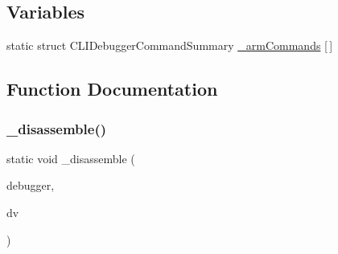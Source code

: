 \subsection*{Variables}
\begin{DoxyCompactItemize}
\item 
static struct C\+L\+I\+Debugger\+Command\+Summary \mbox{\hyperlink{arm_2debugger_2cli-debugger_8c_a4369077d6b3042008429e77a98dbd444}{\+\_\+arm\+Commands}} \mbox{[}$\,$\mbox{]}
\end{DoxyCompactItemize}


\subsection{Function Documentation}
\mbox{\label{arm_2debugger_2cli-debugger_8c_ab744a20db75c627a6cf552eee9339cc0}} 
\subsubsection{\texorpdfstring{\+\_\+disassemble()}{\_disassemble()}}
{\footnotesize\ttfamily static void \+\_\+disassemble (\begin{DoxyParamCaption}\item[{struct C\+L\+I\+Debugger\+System $\ast$}]{debugger,  }\item[{struct C\+L\+I\+Debug\+Vector $\ast$}]{dv }\end{DoxyParamCaption})\hspace{0.3cm}{\ttfamily [static]}}

